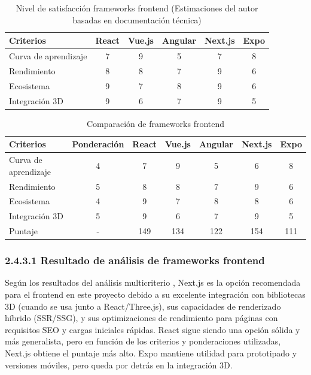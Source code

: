 \begin{table}[ht]
\centering
\caption{Nivel de satisfacción frameworks frontend (Estimaciones del autor basadas en documentación técnica)}
\begin{tabular}{l c c c c c}
\hline
Criterios & React & Vue.js & Angular & Next.js & Expo \\
\hline
Curva de aprendizaje & 7 & 9 & 5 & 7 & 8 \\
Rendimiento & 8 & 8 & 7 & 9 & 6 \\
Ecosistema & 9 & 7 & 8 & 9 & 6 \\
Integración 3D & 9 & 6 & 7 & 9 & 5 \\
\hline
\end{tabular}
\end{table}
\FloatBarrier

\begin{table}[ht]
\centering
\caption{Comparación de frameworks frontend}
\begin{tabular}{l c c c c c c}
\hline
Criterios & Ponderación & React & Vue.js & Angular & Next.js & Expo \\
\hline
Curva de aprendizaje & 4 & 7 & 9 & 5 & 6 & 8 \\
Rendimiento & 5 & 8 & 8 & 7 & 9 & 6 \\
Ecosistema & 4 & 9 & 7 & 8 & 8 & 6 \\
Integración 3D & 5 & 9 & 6 & 7 & 9 & 5 \\
\hline
Puntaje & - & 149 & 134 & 122 & 154 & 111 \\
\hline
\end{tabular}
\end{table}
\FloatBarrier
\subsubsection{2.4.3.1 Resultado de análisis de frameworks frontend}
Según los resultados del análisis multicriterio \cite{belton2002}, Next.js \cite{nextjs_docs2024} es la opción recomendada para el frontend en este proyecto debido a su excelente integración con bibliotecas 3D (cuando se usa junto a React/Three.js), sus capacidades de renderizado híbrido (SSR/SSG), y sus optimizaciones de rendimiento para páginas con requisitos SEO y cargas iniciales rápidas. React sigue siendo una opción sólida y más generalista, pero en función de los criterios y ponderaciones utilizadas, Next.js obtiene el puntaje más alto. Expo \cite{expo_docs2023} mantiene utilidad para prototipado y versiones móviles, pero queda por detrás en la integración 3D.

